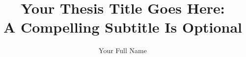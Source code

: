 \documentclass[gpscopy,onehalfspacing,11pt]{ubcdiss}
\title{Your Thesis Title Goes Here: \\ A Compelling Subtitle Is Optional}
\author{Your Full Name}
\begin{document}

\maketitle

\makecommitteepage


\cleardoublepage


\cleardoublepage


\cleardoublepage

\tableofcontents
\cleardoublepage	%

\listoftables
\cleardoublepage	%

\listoffigures
\cleardoublepage	%



\textspacing		%





\mainmatter

\acresetall	%




\end{document}
